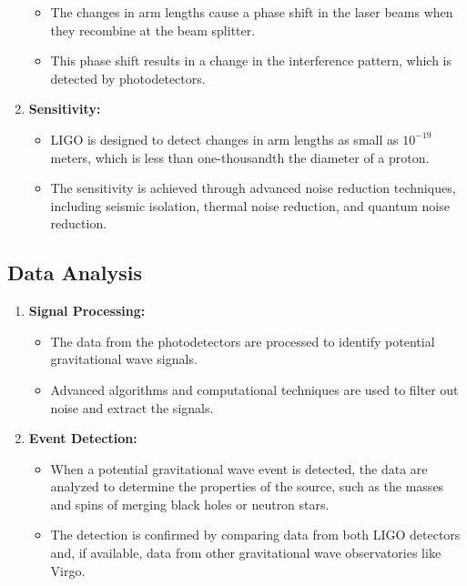 \documentclass[
  a4paper,
]{book}
\providecommand{\tightlist}{%
  \setlength{\itemsep}{0pt}\setlength{\parskip}{0pt}}
\begin{document}
\begin{tcolorbox}
\begin{enumerate}
  \begin{itemize}
  \tightlist
  \item
    The changes in arm lengths cause a phase shift in the laser beams
    when they recombine at the beam splitter.
  \item
    This phase shift results in a change in the interference pattern,
    which is detected by photodetectors.
  \end{itemize}
\item
  \textbf{Sensitivity:}

  \begin{itemize}
  \tightlist
  \item
    LIGO is designed to detect changes in arm lengths as small as
    \(10^{-19}\) meters, which is less than one-thousandth the diameter
    of a proton.
  \item
    The sensitivity is achieved through advanced noise reduction
    techniques, including seismic isolation, thermal noise reduction,
    and quantum noise reduction.
  \end{itemize}
\end{enumerate}

\subsection{Data Analysis}\label{data-analysis}

\begin{enumerate}
\def\labelenumi{\arabic{enumi}.}
\tightlist
\item
  \textbf{Signal Processing:}

  \begin{itemize}
  \tightlist
  \item
    The data from the photodetectors are processed to identify potential
    gravitational wave signals.
  \item
    Advanced algorithms and computational techniques are used to filter
    out noise and extract the signals.
  \end{itemize}
\item
  \textbf{Event Detection:}

  \begin{itemize}
  \tightlist
  \item
    When a potential gravitational wave event is detected, the data are
    analyzed to determine the properties of the source, such as the
    masses and spins of merging black holes or neutron stars.
  \item
    The detection is confirmed by comparing data from both LIGO
    detectors and, if available, data from other gravitational wave
    observatories like Virgo.
  \end{itemize}
\end{enumerate}

\end{tcolorbox}
\end{document}

